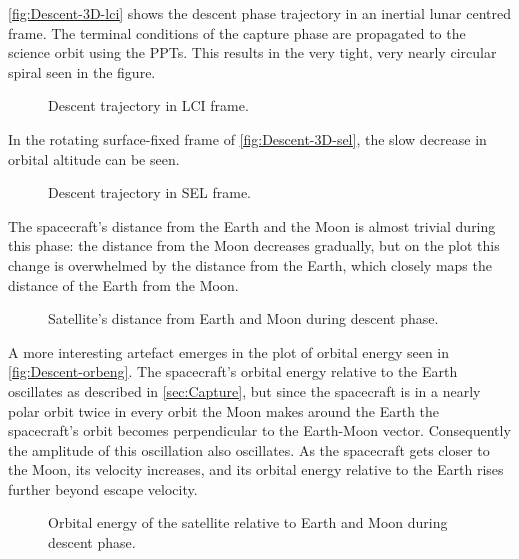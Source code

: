 \autoref{fig:Descent-3D-lci} shows the descent phase trajectory in an inertial lunar centred frame. The terminal conditions of the capture phase are propagated to the science orbit using the PPTs. This results in the very tight, very nearly circular spiral seen in the figure.

\begin{figure}
\centering
\def\svgwidth{\figurewidth}

\caption{Descent trajectory in LCI frame.} \label{fig:Descent-3D-lci}
\end{figure}

In the rotating surface-fixed frame of \autoref{fig:Descent-3D-sel}, the slow decrease in orbital altitude can be seen.

\begin{figure}
\centering
\def\svgwidth{\figurewidth}

\caption{Descent trajectory in SEL frame.} \label{fig:Descent-3D-sel}
\end{figure}

The spacecraft's distance from the Earth and the Moon is almost trivial during this phase: the distance from the Moon decreases gradually, but on the plot this change is overwhelmed by the distance from the Earth, which closely maps the distance of the Earth from the Moon.

\begin{figure}
\centering
\def\svgwidth{\figurewidth}

\caption{Satellite's distance from Earth and Moon during descent phase.} \label{fig:Descent-dist}
\end{figure}

A more interesting artefact emerges in the plot of orbital energy seen in \autoref{fig:Descent-orbeng}. The spacecraft's orbital energy relative to the Earth oscillates as described in \autoref{sec:Capture}, but since the spacecraft is in a nearly polar orbit twice in every orbit the Moon makes around the Earth the spacecraft's orbit becomes perpendicular to the Earth-Moon vector. Consequently the amplitude of this oscillation also oscillates. As the spacecraft gets closer to the Moon, its velocity increases, and its orbital energy relative to the Earth rises further beyond escape velocity.

\begin{figure}
\centering
\def\svgwidth{\figurewidth}

\caption{Orbital energy of the satellite relative to Earth and Moon during descent phase.} \label{fig:Descent-orbeng}
\end{figure}

